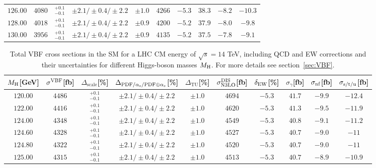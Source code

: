 \begin{table}[ht]
\begin{center}
\begin{small}
\begin{tabular}{cccccccc|cc}
$126.00$ & $4080$ & $^{+0.1}_{-0.1}$ & $\pm 2.1/\pm 0.4/\pm 2.2$ & $\pm 1.0$ & $4266$ & $-5.3$ & $38.3$ & $-8.2$ & $-10.3$ \\
$128.00$ & $4018$ & $^{+0.1}_{-0.1}$ & $\pm 2.1/\pm 0.4/\pm 2.2$ & $\pm 0.9$ & $4200$ & $-5.2$ & $37.9$ & $-8.0$ & $-9.8 $ \\
$130.00$ & $3956$ & $^{+0.1}_{-0.1}$ & $\pm 2.1/\pm 0.4/\pm 2.2$ & $\pm 0.9$ & $4135$ & $-5.2$ & $37.5$ & $-7.8$ & $-9.1 $ \\
\bottomrule
\end{tabular}%
\end{small}%
\end{center}%
\end{table}

\begin{table}[ht]
\caption{Total VBF cross sections in the SM for a LHC CM energy of $\sqrt{s}=14$ TeV, including QCD and EW corrections
and their uncertainties for different Higgs-boson masses $M_\mathrm{H}$. For more details see section~\ref{sec:VBF}.}
\label{tab:vbf_XStot_14}
\begin{center}%
\begin{small}%
\begin{tabular}{cccccccc|cc}%
\toprule
$M_\mathrm{H}$[GeV] & $\sigma^{\mathrm{VBF}}$[fb] & $\Delta_{\mathrm{scale}}$[\%] & $\Delta_{\mathrm{PDF}/\alpha_{\mathrm{s}}/\mathrm{PDF\oplus\alpha_{\mathrm{s}}}}$[\%] & $\Delta_{\mathrm{TU}}$[\%] &
$\sigma_{\mathrm{N3LO}}^{\mathrm{DIS}}$[fb] & $\delta_{\mathrm{EW}}$[\%] & $\sigma_{\gamma}$[fb] & $\sigma_{\mbox{\scriptsize nf}}$[fb] & $\sigma_{\mbox{\scriptsize s/t/u}}$[fb]
\\
\midrule
$120.00$ & $4486$ & $^{+0.1}_{-0.1}$ & $\pm 2.1/\pm 0.4/\pm 2.2$ & $\pm 1.0$ & $4694$ & $-5.3$ & $41.7$ & $-9.9$ & $-12.4$ \\
$122.00$ & $4416$ & $^{+0.1}_{-0.1}$ & $\pm 2.1/\pm 0.4/\pm 2.2$ & $\pm 1.0$ & $4620$ & $-5.3$ & $41.3$ & $-9.5$ & $-11.9$ \\
$124.00$ & $4348$ & $^{+0.1}_{-0.1}$ & $\pm 2.1/\pm 0.4/\pm 2.2$ & $\pm 1.0$ & $4549$ & $-5.3$ & $40.8$ & $-9.1$ & $-11.2$ \\
$124.60$ & $4328$ & $^{+0.1}_{-0.1}$ & $\pm 2.1/\pm 0.4/\pm 2.2$ & $\pm 1.0$ & $4527$ & $-5.3$ & $40.7$ & $-9.0$ & $-11  $ \\
$124.80$ & $4322$ & $^{+0.1}_{-0.1}$ & $\pm 2.1/\pm 0.4/\pm 2.2$ & $\pm 1.0$ & $4520$ & $-5.3$ & $40.7$ & $-9.0$ & $-11  $ \\
$125.00$ & $4315$ & $^{+0.1}_{-0.1}$ & $\pm 2.1/\pm 0.4/\pm 2.2$ & $\pm 1.0$ & $4513$ & $-5.3$ & $40.7$ & $-8.9$ & $-10.9$ \\

\end{tabular}
\end{small}
\end{center}
\end{table}
